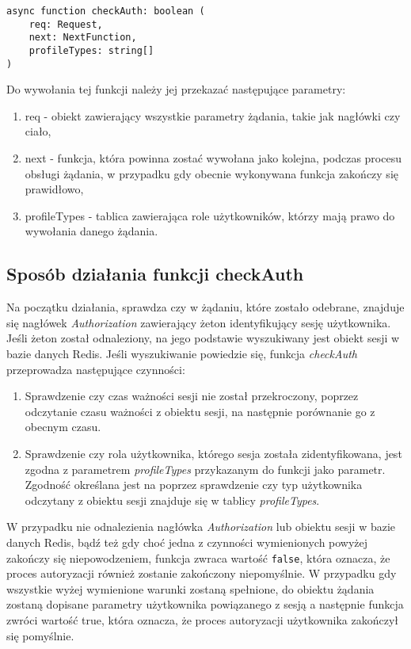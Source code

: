 \documentclass[a4paper,12pt,twoside,openany]{report}
\begin{document}
\begin{lstlisting}[caption=Sygnatura funkcji checkAuth,label=code1,captionpos=b]
async function checkAuth: boolean (
	req: Request,
	next: NextFunction,                        
	profileTypes: string[]
)
\end{lstlisting}



Do wywołania tej funkcji należy jej przekazać następujące parametry:
\begin{enumerate}
	
	\item req - obiekt zawierający wszystkie parametry żądania, takie jak nagłówki czy ciało,
	
	\item next - funkcja, która powinna zostać wywołana jako kolejna, podczas procesu obsługi żądania, w przypadku gdy obecnie wykonywana funkcja zakończy się prawidłowo,
	
	\item profileTypes - tablica zawierająca role użytkowników, którzy mają prawo do wywołania danego żądania.
\end{enumerate}

\subsection{Sposób działania funkcji checkAuth}
Na początku działania, sprawdza czy w żądaniu, które zostało odebrane, znajduje się nagłówek \textit{Authorization} zawierający żeton identyfikujący sesję użytkownika. Jeśli żeton został odnaleziony, na jego podstawie wyszukiwany jest obiekt sesji w bazie danych Redis. Jeśli wyszukiwanie powiedzie się, funkcja \textit{checkAuth} przeprowadza następujące czynności:
\begin{enumerate}	
	\item Sprawdzenie czy czas ważności sesji nie został przekroczony, poprzez odczytanie czasu ważności z obiektu sesji, na następnie porównanie go z obecnym czasu. 
	
	\item Sprawdzenie czy rola użytkownika, którego sesja została zidentyfikowana, jest zgodna z parametrem \textit{profileTypes} przykazanym do funkcji jako parametr. Zgodność określana jest na poprzez sprawdzenie czy typ użytkownika odczytany z obiektu sesji znajduje się w tablicy \textit{profileTypes}.
\end{enumerate}
W przypadku nie odnalezienia nagłówka \textit{Authorization} lub obiektu sesji w bazie danych Redis, bądź też gdy choć jedna z czynności wymienionych powyżej zakończy się niepowodzeniem, funkcja zwraca wartość \verb|false|, która oznacza, że proces autoryzacji również zostanie zakończony niepomyślnie. W przypadku gdy wszystkie wyżej wymienione warunki zostaną spełnione, do obiektu żądania zostaną dopisane parametry użytkownika powiązanego z sesją a następnie funkcja zwróci wartość true, która oznacza, że proces autoryzacji użytkownika zakończył się pomyślnie.
\end{document}
